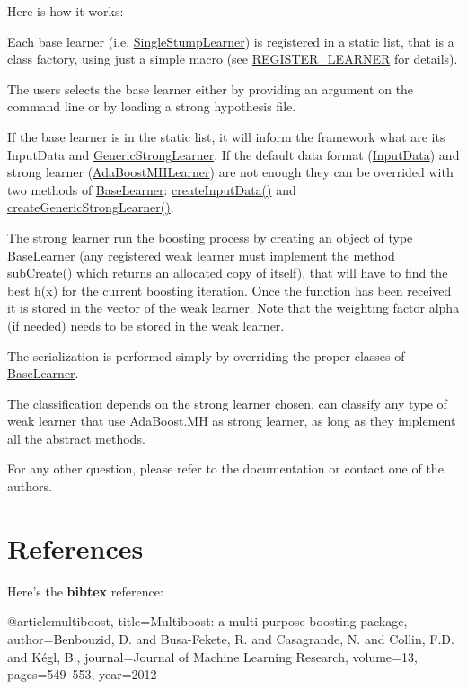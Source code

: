 Here is how it works:\par
 \begin{DoxyItemize}
\item Each base learner (i.e. \hyperlink{classMultiBoost_1_1SingleStumpLearner}{SingleStumpLearner}) is registered in a static list, that is a class factory, using just a simple macro (see \hyperlink{BaseLearner_8h_a784f5b7d276202c7de7108eeca341da7}{REGISTER\_\-LEARNER} for details). \item The users selects the base learner either by providing an argument on the command line or by loading a strong hypothesis file. \item If the base learner is in the static list, it will inform the framework what are its InputData and \hyperlink{classMultiBoost_1_1GenericStrongLearner}{GenericStrongLearner}. If the default data format (\hyperlink{classMultiBoost_1_1InputData}{InputData}) and strong learner (\hyperlink{classMultiBoost_1_1AdaBoostMHLearner}{AdaBoostMHLearner}) are not enough they can be overrided with two methods of \hyperlink{classMultiBoost_1_1BaseLearner}{BaseLearner}: \hyperlink{classMultiBoost_1_1BaseLearner_aa6bce26112ef2ce1275385d06467a9a9}{createInputData()} and \hyperlink{classMultiBoost_1_1BaseLearner_a80735a2e6adfc75e52bad70a0072d890}{createGenericStrongLearner()}. \item The strong learner run the boosting process by creating an object of type BaseLearner (any registered weak learner must implement the method subCreate() which returns an allocated copy of itself), that will have to find the best h(x) for the current boosting iteration. Once the function has been received it is stored in the vector of the weak learner. Note that the weighting factor alpha (if needed) needs to be stored in the weak learner. \item The serialization is performed simply by overriding the proper classes of \hyperlink{classMultiBoost_1_1BaseLearner}{BaseLearner}. \item The classification depends on the strong learner chosen. can classify any type of weak learner that use AdaBoost.MH as strong learner, as long as they implement all the abstract methods.\end{DoxyItemize}
For any other question, please refer to the documentation or contact one of the authors.\hypertarget{index_References}{}\section{References}\label{index_References}
Here's the {\bfseries bibtex} reference: \begin{DoxyVerb}
 @article{multiboost,
 title={Multiboost: a multi-purpose boosting package},
 author={Benbouzid, D. and Busa-Fekete, R. and Casagrande, N. and Collin, F.D. and K{\'e}gl, B.},
 journal={Journal of Machine Learning Research},
 volume={13},
 pages={549--553},
 year={2012}
 }\end{DoxyVerb}
 